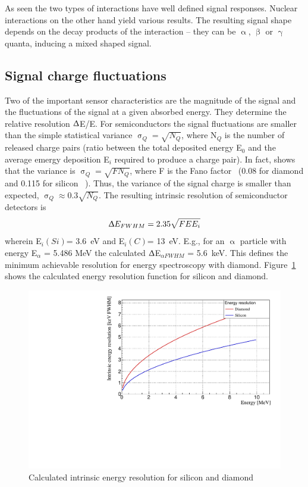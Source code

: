 \documentclass[12pt]{mytustyle}  %
\begin{document}
As seen the two types of interactions have well defined signal responses. Nuclear interactions on the other hand yield various results. The resulting signal shape depends on the decay products of the interaction -- they can be $\upalpha$, $\upbeta$ or $\upgamma$ quanta, inducing a mixed shaped signal. 
%


\subsection{Signal charge fluctuations}
Two of the important sensor characteristics are the magnitude of the signal and the fluctuations of the signal at a given absorbed energy. They determine the relative resolution $\Updelta$E/E. For semiconductors the signal fluctuations are smaller than the simple statistical variance $\upsigma_Q=\sqrt{N_Q}$, where N$_Q$ is the number of released charge pairs (ratio between the total deposited energy E$_0$ and the average emergy deposition E$_i$ required to produce a charge pair). In fact, \cite{} shows that the variance is $\upsigma_Q=\sqrt{F N_Q}$, where F is the Fano factor~\cite{} (0.08 for diamond and 0.115 for silicon ~\cite{}). Thus, the variance of the signal charge is smaller than expected, $\upsigma_Q\approx0.3 \sqrt{N_Q}$. The resulting intrinsic resolution of semiconductor detectors is 
\begin{equation}
\label{eq:efwhm}
\Updelta E_{FWHM} = 2.35 \sqrt{FEE_i} 
\end{equation} 
wherein E$_i(Si)$= 3.6~eV and E$_i(C)$= 13~eV. E.g., for an $\upalpha$ particle with energy E$_\alpha$ = 5.486 MeV the calculated $\Updelta$E$_{\alpha FWHM}$ = 5.6~keV. This defines the minimum achievable resolution for energy spectroscopy with diamond. Figure~\ref{fig:enerres} shows the calculated energy resolution function for silicon and diamond.


\begin{figure}[!t]
\begin{center}
\includegraphics[width=0.6\linewidth]{plots/Intrinsic_energy_res}
\caption{Calculated intrinsic energy resolution for silicon and diamond}
\label{fig:enerres}
\end{center}
\end{figure}
\end{document}

